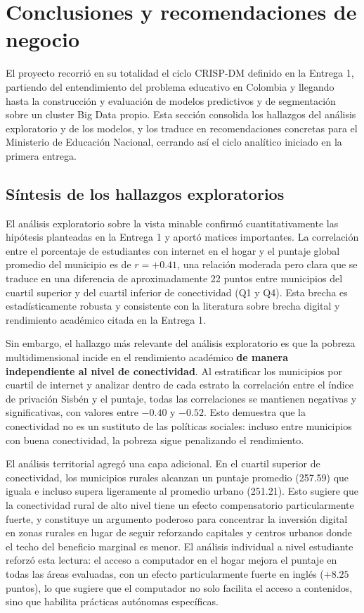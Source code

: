 \section{Conclusiones y recomendaciones de negocio}
El proyecto recorrió en su totalidad el ciclo CRISP-DM definido en la Entrega 1, partiendo del entendimiento del problema educativo en Colombia y llegando hasta la construcción y evaluación de modelos predictivos y de segmentación sobre un cluster Big Data propio. Esta sección consolida los hallazgos del análisis exploratorio y de los modelos, y los traduce en recomendaciones concretas para el Ministerio de Educación Nacional, cerrando así el ciclo analítico iniciado en la primera entrega.

\subsection{Síntesis de los hallazgos exploratorios}
El análisis exploratorio sobre la vista minable confirmó cuantitativamente las hipótesis planteadas en la Entrega 1 y aportó matices importantes. La correlación entre el porcentaje de estudiantes con internet en el hogar y el puntaje global promedio del municipio es de $r = +0.41$, una relación moderada pero clara que se traduce en una diferencia de aproximadamente 22 puntos entre municipios del cuartil superior y del cuartil inferior de conectividad (Q1 y Q4). Esta brecha es estadísticamente robusta y consistente con la literatura sobre brecha digital y rendimiento académico citada en la Entrega 1.

Sin embargo, el hallazgo más relevante del análisis exploratorio es que la pobreza multidimensional incide en el rendimiento académico \textbf{de manera independiente al nivel de conectividad}. Al estratificar los municipios por cuartil de internet y analizar dentro de cada estrato la correlación entre el índice de privación Sisbén y el puntaje, todas las correlaciones se mantienen negativas y significativas, con valores entre $-0.40$ y $-0.52$. Esto demuestra que la conectividad no es un sustituto de las políticas sociales: incluso entre municipios con buena conectividad, la pobreza sigue penalizando el rendimiento.

El análisis territorial agregó una capa adicional. En el cuartil superior de conectividad, los municipios rurales alcanzan un puntaje promedio (257.59) que iguala e incluso supera ligeramente al promedio urbano (251.21). Esto sugiere que la conectividad rural de alto nivel tiene un efecto compensatorio particularmente fuerte, y constituye un argumento poderoso para concentrar la inversión digital en zonas rurales en lugar de seguir reforzando capitales y centros urbanos donde el techo del beneficio marginal es menor. El análisis individual a nivel estudiante reforzó esta lectura: el acceso a computador en el hogar mejora el puntaje en todas las áreas evaluadas, con un efecto particularmente fuerte en inglés ($+8.25$ puntos), lo que sugiere que el computador no solo facilita el acceso a contenidos, sino que habilita prácticas autónomas específicas.

